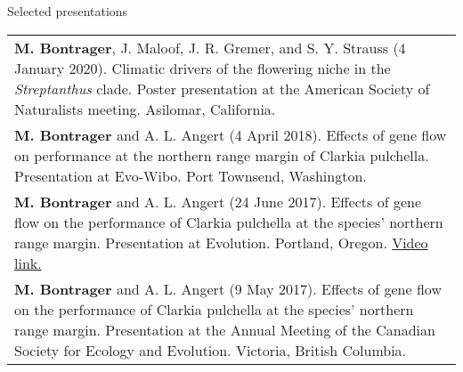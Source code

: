 \documentclass[letterpaper,11pt,oneside]{article}
\begin{document}

\noindent\Large{Selected presentations}  
\normalsize
\bigskip

\def\arraystretch{1.4}
\noindent \begin{tabular}{@{} >{\raggedright\arraybackslash}p{17.2cm}}
\hangindent=5mm\textbf{M. Bontrager}, J. Maloof, J. R. Gremer, and S. Y. Strauss (4 January 2020). Climatic drivers of the flowering niche in the \textit{Streptanthus} clade. Poster presentation at the American Society of Naturalists meeting. Asilomar, California. \\
\hangindent=5mm\textbf{M. Bontrager} and A. L. Angert (4 April 2018). Effects of gene flow on performance  at the northern range margin of Clarkia pulchella. Presentation at Evo-Wibo. Port Townsend, Washington. \\
\hangindent=5mm\textbf{M. Bontrager} and A. L. Angert (24 June 2017). Effects of gene flow on the performance of Clarkia pulchella at the species’ northern range margin. Presentation at Evolution. Portland, Oregon. \href{https://www.youtube.com/watch?v=HqVgQzIJLyA}{Video link.} \\
\hangindent=5mm\textbf{M. Bontrager} and A. L. Angert (9 May 2017). Effects of gene flow on the performance of Clarkia pulchella at the species’ northern range margin. Presentation at the Annual Meeting of the Canadian Society for Ecology and Evolution. Victoria, British Columbia. \\
\end{tabular}
\end{document}
